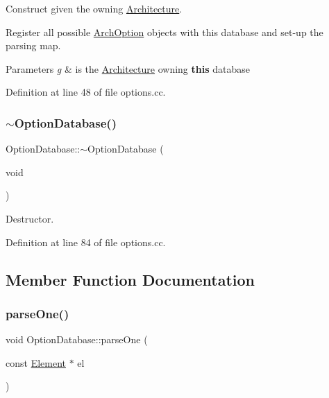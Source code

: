 Construct given the owning \mbox{\hyperlink{class_architecture}{Architecture}}. 

Register all possible \mbox{\hyperlink{class_arch_option}{Arch\+Option}} objects with this database and set-\/up the parsing map. 
\begin{DoxyParams}{Parameters}
{\em g} & is the \mbox{\hyperlink{class_architecture}{Architecture}} owning {\bfseries{this}} database \\
\hline
\end{DoxyParams}


Definition at line 48 of file options.\+cc.

\mbox{\label{class_option_database_a5b4621e877dfce85e719f9bdf11e275f}} 
\subsubsection{\texorpdfstring{$\sim$OptionDatabase()}{~OptionDatabase()}}
{\footnotesize\ttfamily Option\+Database\+::$\sim$\+Option\+Database (\begin{DoxyParamCaption}\item[{void}]{ }\end{DoxyParamCaption})}



Destructor. 



Definition at line 84 of file options.\+cc.



\subsection{Member Function Documentation}
\mbox{\label{class_option_database_ae8bf1e8bf96b3bbb863ddd6f99214d5b}} 
\subsubsection{\texorpdfstring{parseOne()}{parseOne()}}
{\footnotesize\ttfamily void Option\+Database\+::parse\+One (\begin{DoxyParamCaption}\item[{const \mbox{\hyperlink{class_element}{Element}} $\ast$}]{el }\end{DoxyParamCaption})}



